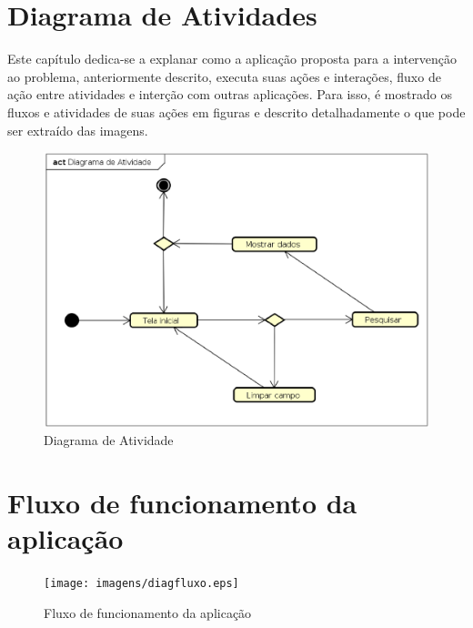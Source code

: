 
\section{Diagrama de Atividades}
Este capítulo dedica-se a explanar como a aplicação proposta para a intervenção ao problema, anteriormente descrito, executa suas ações e interações, fluxo de ação entre atividades e interção com outras aplicações. Para isso, é mostrado os fluxos e atividades de suas ações em figuras e descrito detalhadamente o que pode ser extraído das imagens.



\begin{figure}[!htb]
        \caption{\label{diagact}Diagrama de Atividade}
        \begin{center}
                \includegraphics[width=\textwidth]{imagens/diagact.eps}
        \end{center}
\end{figure}

\newpage
\section{Fluxo de funcionamento da aplicação}
\lipsum[3-7]

\begin{figure}[!htb]
        \caption{\label{diagfluxo}Fluxo de funcionamento da aplicação}
        \begin{center}
                \texttt{[image: imagens/diagfluxo.eps]}
        \end{center}
\end{figure}
